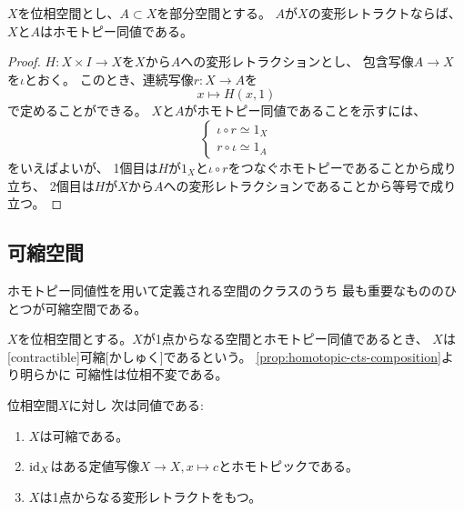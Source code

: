 \documentclass[report]{jlreq}
\begin{document}
\begin{lemma}[変形レトラクトとのホモトピー同値]
    $X$を位相空間とし、$A \subset X$を部分空間とする。
    $A$が$X$の変形レトラクトならば、$X$と$A$はホモトピー同値である。
\end{lemma}

\begin{proof}
    $H \colon X \times I \to X$を$X$から$A$への変形レトラクションとし、
    包含写像$A \to X$を$\iota$とおく。
    このとき、連続写像$r \colon X \to A$を
    \begin{equation}
        x \mapsto H(x, 1)
    \end{equation}
    で定めることができる。
    $X$と$A$がホモトピー同値であることを示すには、
    \begin{equation}
        \begin{cases}
            \iota \circ r \simeq 1_X \\
            r \circ \iota \simeq 1_A
        \end{cases}
    \end{equation}
    をいえばよいが、
    1個目は$H$が$1_X$と$\iota \circ r$をつなぐホモトピーであることから成り立ち、
    2個目は$H$が$X$から$A$への変形レトラクションであることから等号で成り立つ。
\end{proof}

\subsection{可縮空間}

ホモトピー同値性を用いて定義される空間のクラスのうち
最も重要なもののひとつが可縮空間である。

\begin{definition}[可縮空間]
    $X$を位相空間とする。$X$が1点からなる空間とホモトピー同値であるとき、
    $X$は[contractible]{可縮}[かしゅく]であるという。
    \cref{prop:homotopic-cts-composition}より明らかに
    可縮性は位相不変である。
\end{definition}

\begin{proposition}[可縮空間の特徴付け]
    位相空間$X$に対し
    次は同値である:
    \begin{enumerate}
        \item $X$は可縮である。
        \item $\mathrm{id}_X$はある定値写像$X \to X, x \mapsto c$とホモトピックである。
        \item $X$は1点からなる変形レトラクトをもつ。
    \end{enumerate}
\end{proposition}
\end{document}
